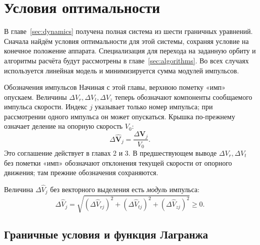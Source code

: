 \section{Условия оптимальности}
\label{sec:optimality}

В главе~\ref{sec:dynamics} получена полная система из шести граничных
уравнений. Сначала найдём условия оптимальности для этой системы,
сохраняя условие на конечное положение аппарата. Специализация для перехода на заданную орбиту
и алгоритмы расчёта будут рассмотрены в главе~\ref{sec:algorithms}.
Во всех случаях используется линейная модель и минимизируется
сумма модулей импульсов.

\begin{explanation}{Обозначения импульсов}
Начиная с этой главы, верхнюю пометку «имп» опускаем.
Величины $\Delta V_r,\Delta V_t,\Delta V_z$ теперь обозначают
компоненты сообщаемого импульса скорости. Индекс $j$ указывает
только номер импульса; при рассмотрении одного импульса он может
опускаться. Крышка по-прежнему означает деление на опорную
скорость $V_0$:
\[
\Delta\widehat{\boldsymbol V}_j
=\frac{\Delta\boldsymbol V_j}{V_0}.
\]
Это соглашение действует в главах 2 и 3.
В предшествующем выводе $\Delta V_r,\Delta V_t$ без пометки «имп»
обозначают отклонения текущей скорости от опорного движения;
там прежние обозначения сохраняются.
\end{explanation}

Величина $\Delta\widehat V_j$ без векторного
выделения есть \emph{модуль} импульса:
\[
 \Delta\widehat V_j=
 \sqrt{(\Delta\widehat V_{rj})^2+(\Delta\widehat V_{tj})^2+
                         (\Delta\widehat V_{zj})^2}\geq0.
\]

\subsection{Граничные условия и функция Лагранжа}

